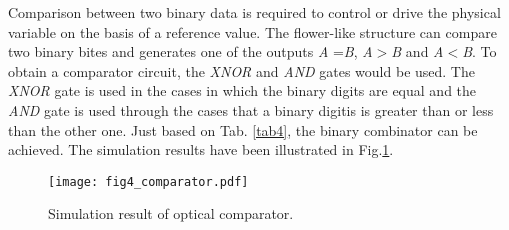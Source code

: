 \documentclass{osa-article}
\begin{document}
\begin{table}[H]
\caption{Logical truth table of the proposed TDM and OPP levels at the input and output (N.A = do not care).}
\centering 
{}
\label{tab3} %
\end{table}

Comparison between two binary data is required to control or drive the physical variable on the basis of a reference value. The flower-like structure can compare two binary bites and generates one of the outputs \textit {A} =\textit {B}, \textit {A}$>$\textit {B} and \textit {A}$<$\textit {B}. To obtain a comparator circuit, the \textit{XNOR} and \textit{AND} gates would be used. The \textit{XNOR} gate is used in the cases in which the binary digits are equal and the \textit{AND} gate is used through the cases that a binary digitis is greater than or less than the other one. Just based on Tab. \ref{tab4}, the binary combinator can be achieved. The simulation results have been illustrated in Fig.\ref{fig4_comparator}.\\
\begin{figure}[tb]
\centering
\texttt{[image: fig4\_comparator.pdf]}
	\caption{Simulation result of optical comparator.}
	\label{fig4_comparator}
\end{figure}
 
\end{document}
